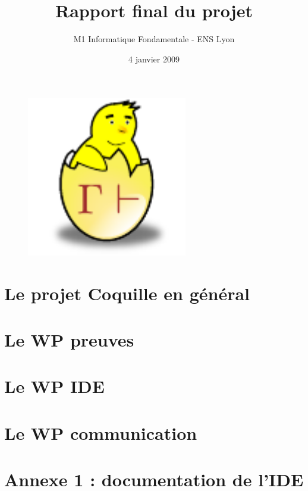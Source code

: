 \documentclass[a4paper,10pt]{report}
\date{4 janvier 2009}
\title{Rapport final du projet \coquille{}}
\author{M1 Informatique Fondamentale - ENS Lyon}
\begin{document}
\begin{figure}
\begin{center}
 \includegraphics[width=7cm]{../images/common/poussin.pdf}
\end{center}
\end{figure}

\maketitle

\newpage

\tableofcontents

\chapter{Le projet Coquille en g\'en\'eral}


\chapter{Le WP preuves}


\chapter{Le WP IDE}


%

\chapter{Le WP communication}





\chapter{Annexe 1 : documentation de l'IDE}
%
\end{document}
